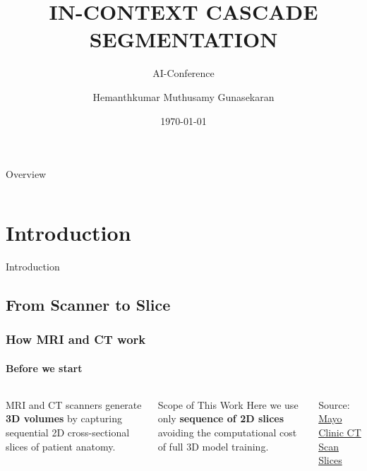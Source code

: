 \documentclass[nometaot,lecture,amberg,toc=twocolumn,indicatelastpageofframe,footlinebox]{OTHAWbeamer}
\title{IN-CONTEXT CASCADE SEGMENTATION}
\subtitle{AI-Conference}
\author{Hemanthkumar Muthusamy Gunasekaran}
\date{\today}
\begin{document}
\maketitle
{}

\begin{frame}{Overview}
    \begin{columns}[t]
            \tableofcontents[sections={1-3},hideallsubsections]
            \tableofcontents[sections={4-6},hideallsubsections]
    \end{columns}
\end{frame}

\section{Introduction}
\begin{breakframe}
    Introduction
\end{breakframe}

\subsection{From Scanner to Slice}
\begin{frame}
    \frametitle{How MRI and CT work}
    \framesubtitle{Before we start}

    \begin{columns}[t]

            MRI and CT scanners generate \textcolor{orange1}{\textbf{3D volumes}}
            by capturing sequential 2D cross-sectional slices of patient anatomy.

            \vspace{0.6em}

            \vspace{0.6em}

            \begin{block}{Scope of This Work}
                Here we use only \textbf{sequence of 2D slices}
                avoiding the computational cost of full 3D model training.
            \end{block}

            \vspace{0pt}
            \centering
            

            \vspace{0.3em}
            {\tiny\textcolor{grau2}{Source: \href{https://www.mayoclinic.org/tests-procedures/ct-scan/multimedia/ct-scan-slices/img-20008348}{Mayo Clinic CT Scan Slices}}}

    \end{columns}

\end{frame}
\end{document}
